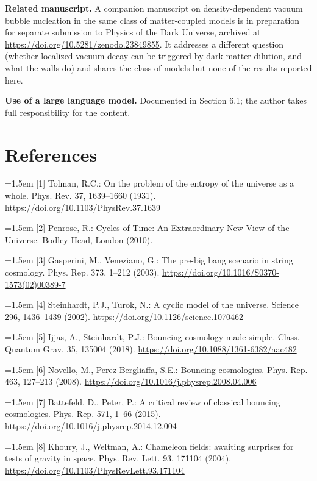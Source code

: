 \documentclass[11pt,a4paper]{article}
\begin{document}
\noindent\textbf{Related manuscript.} A companion manuscript on density-dependent vacuum bubble nucleation in the same class of matter-coupled models is in preparation for separate submission to Physics of the Dark Universe, archived at \url{https://doi.org/10.5281/zenodo.23849855}. It addresses a different question (whether localized vacuum decay can be triggered by dark-matter dilution, and what the walls do) and shares the class of models but none of the results reported here.

\noindent\textbf{Use of a large language model.} Documented in Section 6.1; the author takes full responsibility for the content.

\section*{References}
\noindent\hangindent=1.5em [1] Tolman, R.C.: On the problem of the entropy of the universe as a whole. Phys. Rev. 37, 1639--1660 (1931). \url{https://doi.org/10.1103/PhysRev.37.1639}\par
\noindent\hangindent=1.5em [2] Penrose, R.: Cycles of Time: An Extraordinary New View of the Universe. Bodley Head, London (2010).\par
\noindent\hangindent=1.5em [3] Gasperini, M., Veneziano, G.: The pre-big bang scenario in string cosmology. Phys. Rep. 373, 1--212 (2003). \url{https://doi.org/10.1016/S0370-1573(02)00389-7}\par
\noindent\hangindent=1.5em [4] Steinhardt, P.J., Turok, N.: A cyclic model of the universe. Science 296, 1436--1439 (2002). \url{https://doi.org/10.1126/science.1070462}\par
\noindent\hangindent=1.5em [5] Ijjas, A., Steinhardt, P.J.: Bouncing cosmology made simple. Class. Quantum Grav. 35, 135004 (2018). \url{https://doi.org/10.1088/1361-6382/aac482}\par
\noindent\hangindent=1.5em [6] Novello, M., Perez Bergliaffa, S.E.: Bouncing cosmologies. Phys. Rep. 463, 127--213 (2008). \url{https://doi.org/10.1016/j.physrep.2008.04.006}\par
\noindent\hangindent=1.5em [7] Battefeld, D., Peter, P.: A critical review of classical bouncing cosmologies. Phys. Rep. 571, 1--66 (2015). \url{https://doi.org/10.1016/j.physrep.2014.12.004}\par
\noindent\hangindent=1.5em [8] Khoury, J., Weltman, A.: Chameleon fields: awaiting surprises for tests of gravity in space. Phys. Rev. Lett. 93, 171104 (2004). \url{https://doi.org/10.1103/PhysRevLett.93.171104}\par
\end{document}
